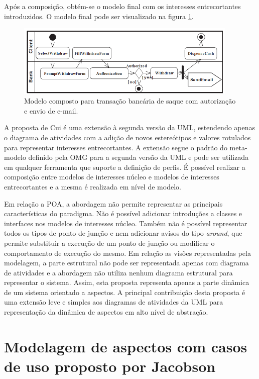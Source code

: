 Após a composição, obtém-se o modelo final com os interesses entrecortantes introduzidos. O modelo final pode ser visualizado na figura
\ref{fig:withdraw_final}.

\begin{figure}
	\centering
	\includegraphics[width=400px]{img/withdraw_final.png}
	\caption{Modelo composto para transação bancária de
	saque com autorização e envio de e-mail.}\label{fig:withdraw_final}
\end{figure}

A proposta de Cui é uma extensão à segunda versão da UML, estendendo apenas o diagrama de atividades com a adição de novos estereótipos e valores
rotulados para representar interesses entrecortantes. A extensão segue o padrão do meta-modelo definido pela OMG para a segunda versão da UML e 
pode ser utilizada em qualquer ferramenta que suporte a definição de perfis. É possível realizar a composição entre modelos de interesses núcleo e
modelos de interesses entrecortantes e a mesma é realizada em nível de modelo.

Em relação a POA, a abordagem não permite representar as principais características do paradigma. Não é possível adicionar introduções a classes e
interfaces nos modelos de interesses núcleo. Também não é possível representar todos os tipos de ponto de junção e nem adicionar avisos do tipo \textit{around}, que permite
substituir a execução de um ponto de junção ou modificar o comportamento de execução do mesmo. Em relação as visões representadas pela modelagem, a
parte estrutural não pode ser representada apenas com diagrama de atividades e a abordagem não utiliza nenhum diagrama estrutural para representar o
sistema. Assim, esta proposta representa apenas a parte dinâmica de um sistema orientado a aspectos. A principal contribuição desta proposta é uma
extensão leve e simples aos diagramas de atividades da UML para representação da dinâmica de aspectos em alto nível de abstração.

\section{Modelagem de aspectos com casos de uso proposto por Jacobson}

